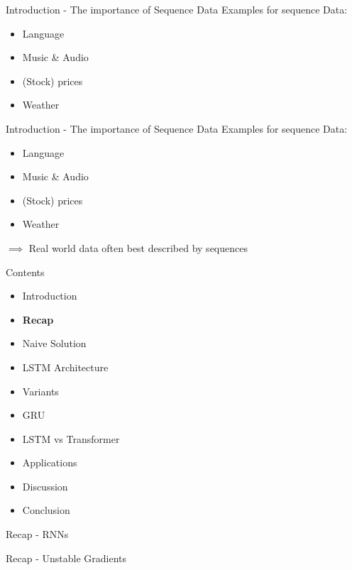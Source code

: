 \documentclass[10pt, aspectratio=169]{beamer}
\begin{document}
\begin{frame}[t]{Introduction - The importance of Sequence Data}
Examples for sequence Data:
\begin{itemize}
    \item Language
    \item Music \& Audio
    \item (Stock) prices
    \item Weather
\end{itemize}
\end{frame}

\begin{frame}[t]{Introduction - The importance of Sequence Data}
Examples for sequence Data:
\begin{itemize}
    \item Language
    \item Music \& Audio
    \item (Stock) prices
    \item Weather
\end{itemize}
\begin{math}\implies\end{math} Real world data often best described by sequences
\end{frame}



\begin{frame}[t]{Contents}
\begin{itemize}
    \item Introduction
    \item \textbf{Recap}
    \item Naive Solution
    \item LSTM Architecture
    \item Variants
    \item GRU
    \item LSTM vs Transformer
    \item Applications
    \item Discussion
    \item Conclusion
\end{itemize}
\end{frame}

\begin{frame}[t]{Recap - RNNs}
    
\end{frame}

\begin{frame}{Recap - Unstable Gradients}
    
\end{frame}
\end{document}
